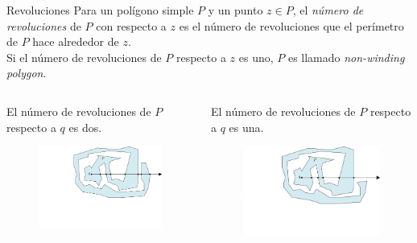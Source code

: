 \documentclass[aspectratio=169,xcolor=dvipsnames, t]{beamer}
\begin{document}
\begin{frame}[c]{Revoluciones}
  Para un polígono simple $P$ y un punto $z \in P$, el \textit{número de revoluciones} de $P$ con respecto a $z$ es el número de revoluciones que el perímetro de $P$ hace alrededor de $z$.\\
  \vspace{0.5cm}
  Si el número de revoluciones de $P$ respecto a $z$ es uno, $P$ es llamado \textit{non-winding polygon}.
\end{frame}

\begin{frame}{}
  \begin{columns}
    \begin{column}{0.45\textwidth}
      El número de revoluciones de $P$ respecto a $q$ es dos.
      \begin{figure}
        \centering
        \includegraphics[width=1.2\textwidth]{imagenes/Case2.2a.png}
      \end{figure}
    \end{column}
    \begin{column}{0.45\textwidth}  %
      El número de revoluciones de $P$ respecto a $q$ es una.
      \begin{figure}
        \centering
        \includegraphics[width=1.2\textwidth]{imagenes/Caso2.2b.png}

\end{figure}
\end{column}
\end{columns}
\end{frame}
\end{document}
